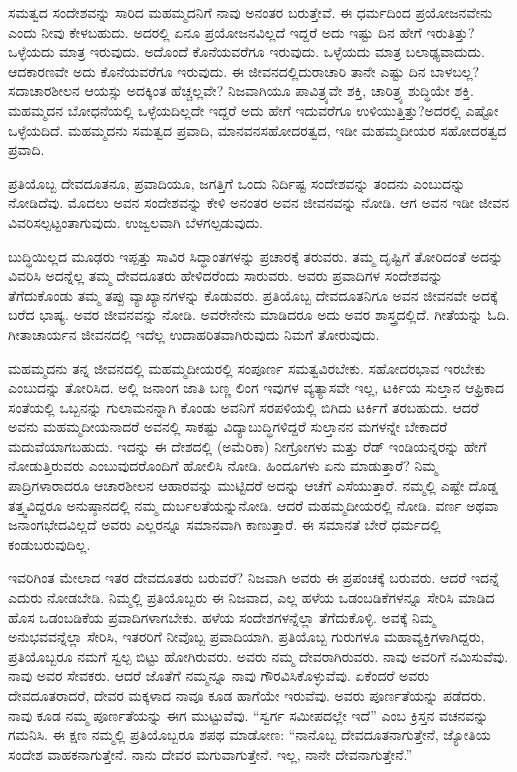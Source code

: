 ಸಮತ್ವದ ಸಂದೇಶವನ್ನು ಸಾರಿದ ಮಹಮ್ಮದನಿಗೆ ನಾವು ಅನಂತರ ಬರುತ್ತೇವೆ. ಈ ಧರ್ಮದಿಂದ ಪ್ರಯೋಜನವೇನು ಎಂದು ನೀವು ಕೇಳಬಹುದು. ಅದರಲ್ಲಿ ಏನೂ ಪ್ರಯೋಜನವಿಲ್ಲದೆ ಇದ್ದರೆ ಅದು ಇಷ್ಟು ದಿನ ಹೇಗೆ ಇರುತಿತ್ತು? ಒಳ್ಳೆಯದು ಮಾತ್ರ ಇರುವುದು. ಅದೊಂದೆ ಕೊನೆಯವರೆಗೂ ಇರುವುದು. ಒಳ್ಳೆಯದು ಮಾತ್ರ ಬಲಾಢ್ಯ\break ವಾದುದು. ಆದಕಾರಣವೇ ಅದು ಕೊನೆಯವರೆಗೂ ಇರುವುದು. ಈ ಜೀವನದಲ್ಲಿ\break ದುರಾಚಾರಿ ತಾನೇ ಎಷ್ಟು ದಿನ ಬಾಳಬಲ್ಲ? ಸದಾಚಾರಶೀಲನ ಆಯಸ್ಸು ಅದಕ್ಕಿಂತ ಹೆಚ್ಚಲ್ಲವೇ? ನಿಜವಾಗಿಯೂ ಪಾವಿತ್ರ್ಯವೇ ಶಕ್ತಿ, ಚಾರಿತ್ರ್ಯ ಶುದ್ಧಿಯೇ ಶಕ್ತಿ. ಮಹಮ್ಮದನ ಬೋಧನೆಯಲ್ಲಿ ಒಳ್ಳೆಯದಿಲ್ಲದೇ ಇದ್ದರೆ ಅದು ಹೇಗೆ ಇದುವರೆಗೂ ಉಳಿಯುತ್ತಿತ್ತು?\break ಅದರಲ್ಲಿ ಎಷ್ಟೋ ಒಳ್ಳೆಯದಿದೆ. ಮಹಮ್ಮದನು ಸಮತ್ವದ ಪ್ರವಾದಿ, ಮಾನವನ\break ಸಹೋದರತ್ವದ, ಇಡೀ ಮಹಮ್ಮದೀಯರ ಸಹೋದರತ್ವದ ಪ್ರವಾದಿ.

ಪ್ರತಿಯೊಬ್ಬ ದೇವದೂತನೂ, ಪ್ರವಾದಿಯೂ, ಜಗತ್ತಿಗೆ ಒಂದು ನಿರ್ದಿಷ್ಟ ಸಂದೇಶವನ್ನು ತಂದನು ಎಂಬುದನ್ನು ನೋಡಿದೆವು. ಮೊದಲು ಅವನ ಸಂದೇಶವನ್ನು ಕೇಳಿ ಅನಂತರ ಅವನ ಜೀವನವನ್ನು ನೋಡಿ. ಆಗ ಅವನ ಇಡೀ ಜೀವನ ವಿವರಿಸಲ್ಪಟ್ಟಂತಾಗುವುದು. ಉಜ್ವಲವಾಗಿ ಬೆಳಗಲ್ಪಡುವುದು.

ಬುದ್ಧಿಯಿಲ್ಲದ ಮೂಢರು ಇಪ್ಪತ್ತು ಸಾವಿರ ಸಿದ್ಧಾಂತಗಳನ್ನು ಪ್ರಚಾರಕ್ಕೆ ತರುವರು. ತಮ್ಮ ದೃಷ್ಟಿಗೆ ತೋರಿದಂತೆ ಅದನ್ನು ವಿವರಿಸಿ ಅದನ್ನೆಲ್ಲ ತಮ್ಮ ದೇವದೂತರು ಹೇಳಿದರೆಂದು ಸಾರುವರು. ಅವರು ಪ್ರವಾದಿಗಳ ಸಂದೇಶವನ್ನು ತೆಗೆದುಕೊಂಡು ತಮ್ಮ ತಪ್ಪು ವ್ಯಾಖ್ಯಾನಗಳನ್ನು ಕೊಡುವರು. ಪ್ರತಿಯೊಬ್ಬ ದೇವದೂತನಿಗೂ ಅವನ ಜೀವನವೇ ಅದಕ್ಕೆ ಬರೆದ ಭಾಷ್ಯ. ಅವರ ಜೀವನವನ್ನು ನೋಡಿ. ಅವರೇನೇನು ಮಾಡಿದರೂ ಅದು ಅವರ ಶಾಸ್ತ್ರದಲ್ಲಿದೆ. ಗೀತೆಯನ್ನು ಓದಿ. ಗೀತಾಚಾರ್ಯನ ಜೀವನದಲ್ಲಿ ಇದೆಲ್ಲ ಉದಾಹರಿತ\-ವಾಗಿರುವುದು ನಿಮಗೆ ತೋರುವುದು.

ಮಹಮ್ಮದನು ತನ್ನ ಜೀವನದಲ್ಲಿ ಮಹಮ್ಮದೀಯರಲ್ಲಿ ಸಂಪೂರ್ಣ ಸಮತ್ವವಿರ\-ಬೇಕು. ಸಹೋದರಭಾವ ಇರಬೇಕು ಎಂಬುದನ್ನು ತೋರಿಸಿದ. ಅಲ್ಲಿ ಜನಾಂಗ ಜಾತಿ ಬಣ್ಣ ಲಿಂಗ ಇವುಗಳ ವ್ಯತ್ಯಾಸವೇ ಇಲ್ಲ, ಟರ್ಕಿಯ ಸುಲ್ತಾನ ಆಫ್ರಿಕಾದ ಸಂತೆಯಲ್ಲಿ ಒಬ್ಬನನ್ನು ಗುಲಾಮನನ್ನಾಗಿ ಕೊಂಡು ಅವನಿಗೆ ಸರಪಳಿಯಲ್ಲಿ ಬಿಗಿದು ಟರ್ಕಿಗೆ ತರಬಹುದು. ಆದರೆ ಅವನು ಮಹಮ್ಮದೀಯನಾದರೆ ಅವನಲ್ಲಿ ಸಾಕಷ್ಟು ವಿದ್ಯಾಬುದ್ಧಿಗಳಿದ್ದರೆ ಸುಲ್ತಾನನ ಮಗಳನ್ನೇ ಬೇಕಾದರೆ ಮದುವೆಯಾಗಬಹುದು. ಇದನ್ನು ಈ ದೇಶದಲ್ಲಿ (ಅಮೆರಿಕಾ) ನೀಗ್ರೋಗಳು ಮತ್ತು ರೆಡ್​ ಇಂಡಿಯನ್ನರನ್ನು ಹೇಗೆ ನೋಡುತ್ತಿರುವರು ಎಂಬುವುದರೊಂದಿಗೆ ಹೋಲಿಸಿ ನೋಡಿ. ಹಿಂದೂಗಳು ಏನು ಮಾಡುತ್ತಾರೆ? ನಿಮ್ಮ ಪಾದ್ರಿಗಳಾರಾದರೂ ಆಚಾರಶೀಲನ ಆಹಾರವನ್ನು ಮುಟ್ಟಿದರೆ ಅದನ್ನು ಆಚೆಗೆ ಎಸೆಯುತ್ತಾರೆ. ನಮ್ಮಲ್ಲಿ ಎಷ್ಟೇ ದೊಡ್ಡ ತತ್ತ್ವವಿದ್ದರೂ ಅನುಷ್ಠಾನದಲ್ಲಿ ನಮ್ಮ ದುರ್ಬಲತೆಯನ್ನು\break ನೋಡಿ. ಆದರೆ ಮಹಮ್ಮದೀಯರಲ್ಲಿ ನೋಡಿ. ವರ್ಣ ಅಥವಾ ಜನಾಂಗಭೇದವಿಲ್ಲದೆ ಅವರು ಎಲ್ಲರನ್ನೂ ಸಮಾನವಾಗಿ ಕಾಣುತ್ತಾರೆ. ಈ ಸಮಾನತೆ ಬೇರೆ ಧರ್ಮದಲ್ಲಿ ಕಂಡುಬರುವುದಿಲ್ಲ.

ಇವರಿಗಿಂತ ಮೇಲಾದ ಇತರ ದೇವದೂತರು ಬರುವರೆ? ನಿಜವಾಗಿ ಅವರು ಈ ಪ್ರಪಂಚಕ್ಕೆ ಬರುವರು. ಆದರೆ ಇದನ್ನೆ ಎದುರು ನೋಡಬೇಡಿ. ನಿಮ್ಮಲ್ಲಿ ಪ್ರತಿಯೊಬ್ಬರು ಈ ನಿಜವಾದ, ಎಲ್ಲ ಹಳೆಯ ಒಡಂಬಡಿಕೆಗಳನ್ನೂ ಸೇರಿಸಿ ಮಾಡಿದ ಹೊಸ ಒಡಂ\-ಬಡಿಕೆಯ ಪ್ರವಾದಿಗಳಾಗಬೇಕು. ಹಳೆಯ ಸಂದೇಶಗಳನ್ನೆಲ್ಲಾ ತೆಗೆದುಕೊಳ್ಳಿ. ಅವಕ್ಕೆ ನಿಮ್ಮ ಅನುಭವವನ್ನೆಲ್ಲಾ ಸೇರಿಸಿ, ಇತರರಿಗೆ ನೀವೊಬ್ಬ ಪ್ರವಾದಿಯಾಗಿ. ಪ್ರತಿಯೊಬ್ಬ ಗುರುಗಳೂ ಮಹಾವ್ಯಕ್ತಿಗಳಾಗಿದ್ದರು, ಪ್ರತಿಯೊಬ್ಬರೂ ನಮಗೆ ಸ್ವಲ್ಪ ಬಿಟ್ಟು ಹೋಗಿರುವರು. ಅವರು ನಮ್ಮ ದೇವರಾಗಿರುವರು. ನಾವು ಅವರಿಗೆ ನಮಿಸುವೆವು. ನಾವು ಅವರ ಸೇವಕರು. ಆದರೆ ಜೊತೆಗೆ ನಮ್ಮನ್ನೂ ನಾವು ಗೌರವಿಸಿಕೊಳ್ಳುವೆವು. ಏಕೆಂದರೆ ಅವರು ದೇವದೂತರಾದರೆ, ದೇವರ ಮಕ್ಕಳಾದ ನಾವೂ ಕೂಡ ಹಾಗೆಯೇ ಇರುವೆವು. ಅವರು ಪೂರ್ಣತೆಯನ್ನು ಪಡೆದರು. ನಾವು ಕೂಡ ನಮ್ಮ ಪೂರ್ಣತೆಯನ್ನು ಈಗ ಮುಟ್ಟುವೆವು. “ಸ್ವರ್ಗ ಸಮೀಪದಲ್ಲೇ ಇದೆ” ಎಂಬ ಕ್ರಿಸ್ತನ ವಚನವನ್ನು ಗಮನಿಸಿ. ಈ ಕ್ಷಣ ನಮ್ಮಲ್ಲಿ ಪ್ರತಿಯೊಬ್ಬರೂ ಶಪಥ ಮಾಡೋಣ: “ನಾನೊಬ್ಬ ದೇವದೂತನಾಗುತ್ತೇನೆ, ಜ್ಯೋತಿಯ ಸಂದೇಶ ವಾಹಕನಾಗುತ್ತೇನೆ. ನಾನು ದೇವರ ಮಗುವಾಗುತ್ತೇನೆ. ಇಲ್ಲ, ನಾನೇ ದೇವನಾಗುತ್ತೇನೆ.”

